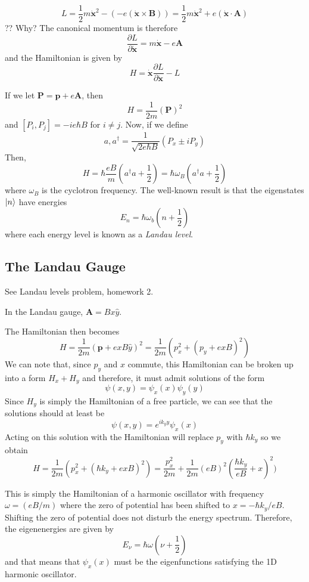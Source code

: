 \documentclass[10pt]{article}
\begin{document}
$$ L = \frac{1}{2}m\dot{\textbf{x}}^{2} - (-e(\dot{\textbf{x}} \times \textbf{B})) = \frac{1}{2}m\dot{\textbf{x}}^{2} + e(\dot{\textbf{x}} \cdot \textbf{A})$$ ?? Why?
The canonical momentum is therefore
$$
\frac{\partial L}{\partial \dot{\textbf{x}}} = m\dot{\textbf{x}} - e\textbf{A}
$$
and the Hamiltonian is given by
$$
H = \dot{\textbf{x}}\frac{\partial L}{\partial \dot{\textbf{x}}} - L
$$

If we let $\textbf{P} = \textbf{p} + e\textbf{A}$, then
$$
H = \frac{1}{2m}(\textbf{P})^{2}
$$
and $[P_{i}, P_{j}] = -ie\hbar B$ for $i \neq j$. Now, if we define
$$
a, a^{\dagger} = \frac{1}{\sqrt{2e\hbar B}}(P_{x} \pm i P_{y})
$$
Then,
$$
H = \hbar \frac{eB}{m}\left (a^{\dagger}a + \frac{1}{2} \right) = \hbar \omega_{B}\left(a^{\dagger}a + \frac{1}{2}\right )
$$
where $\omega_{B}$ is the cyclotron frequency. The well-known result is that the eigenstates $\ket{n}$ have
energies
$$E_{n} = \hbar \omega_{b} \left(n + \frac{1}{2}\right)$$
where each energy level is known as a \emph{Landau level}.

\subsection{The Landau Gauge}
See Landau levels problem, homework 2.

In the Landau gauge, $\textbf{A} = Bx\hat{y}$.

The Hamiltonian then becomes
$$
H = \frac{1}{2m}(\textbf{p} + exB\hat{y})^{2} = \frac{1}{2m}\left ( p_{x}^{2} + (p_{y} + exB)^{2}\right )
$$
We can note that, since $p_{y}$ and $x$ commute, this Hamiltonian can be broken up into a form $H_{x} + H_{y}$ and
therefore, it must admit solutions of the form
$$\psi(x,y) = \psi_{x}(x)\psi_{y}(y)$$
Since $H_{y}$ is simply the Hamiltonian of a free particle, we can see that the solutions should at least be
$$
\psi(x,y) = e^{ik_{y}y}\psi_{x}(x)
$$
Acting on this solution with the Hamiltonian will replace $p_{y}$ with $\hbar k_{y}$ so we obtain
$$
H = \frac{1}{2m}\left ( p_{x}^{2} + (\hbar k_{y} + exB)^{2}\right ) = \frac{p_{x}^{2}}{2m} + \frac{1}{2m}(eB)^{2}(\frac{\hbar k_{y}}{eB} + x)^{2}  )
$$

This is simply the Hamiltonian of a harmonic oscillator with frequency $\omega = (eB/m)$ where the zero of potential has been shifted to $x = -\hbar k_{y}/eB$. Shifting the zero of
potential does not disturb the energy spectrum. Therefore, the eigenenergies are given by
$$
E_{\nu} = \hbar \omega(\nu + \frac{1}{2})
$$
and that means that $\psi_{x}(x)$ must be the eigenfunctions satisfying the 1D harmonic oscillator.
\end{document}
